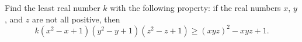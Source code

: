 Find the least real number $k$ with the following property: if the real numbers $x$, $y$, and $z$ are not all positive, then \[k(x^{2}-x+1)(y^{2}-y+1)(z^{2}-z+1)\geq (xyz)^{2}-xyz+1.\]